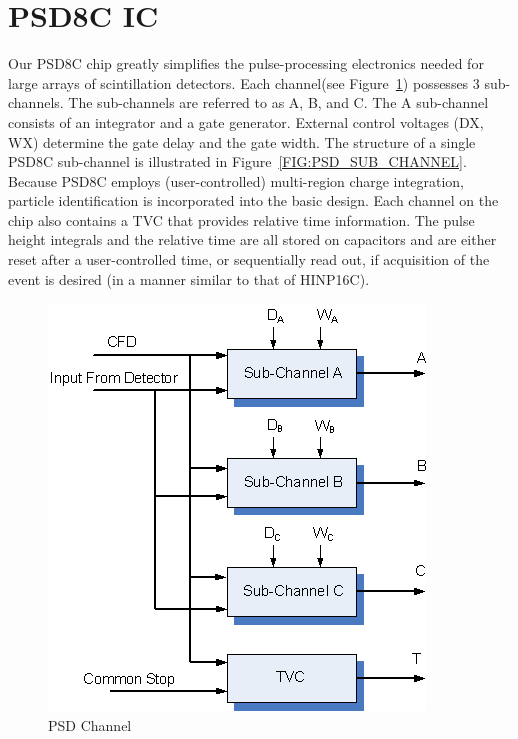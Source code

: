 \documentclass[12pt,oneside,final]{siuethesis}
\theoremstyle{definition}
\begin{document}
\section{PSD8C IC}

Our PSD8C chip greatly simplifies the pulse-processing electronics needed for large arrays of scintillation detectors. Each channel(see Figure~\ref{FIG:PSD_CHANNEL}) possesses 3 sub-channels. The sub-channels are referred to as A, B, and C. The A sub-channel consists of an integrator and a gate generator. External control voltages (DX, WX) determine the gate delay and the gate width. The structure of a single PSD8C sub-channel is illustrated in Figure~\ref{FIG:PSD_SUB_CHANNEL}. Because PSD8C employs (user-controlled) multi-region charge integration, particle identification is incorporated into the basic design. Each channel on the chip also contains a TVC that provides relative time information. The pulse height integrals and the relative time are all stored on capacitors and are either reset after a user-controlled time, or sequentially read out, if acquisition of the event is desired (in a manner similar to that of HINP16C). 

\begin{figure}[htbp!]
	\centering
 	\includegraphics[scale=1.0,keepaspectratio=true]{./ch1_figures/PSD_channel.png}
 	\caption{PSD Channel}
 	\label{FIG:PSD_CHANNEL}
\end{figure}
\end{document}
